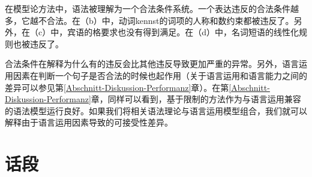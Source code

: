 在模型论方法中，语法被理解为一个合法条件系统。一个表达违反的合法条件越多，它越不合法\citep[--27]{PS2001a}。在（b）中，动词kennst的词项的人称和数约束都被违反了。另外，在（c）中，宾语的格要求也没有得到满足。在（d）中，名词短语的线性化规则也被违反了。

合法条件在解释为什么有的违反会比其他违反导致更加严重的异常。另外，语言运用因素在判断一个句子是否合法的时候也起作用（关于语言运用和语言能力之间的差异可以参见第\ref{Abschnitt-Diskussion-Performanz}章）。在第\ref{Abschnitt-Diskussion-Performanz}章，同样可以看到，基于限制的方法作为与语言运用兼容的语法模型运行良好。如果我们将相关语法理论与语言运用模型组合，我们就可以解释由于语言运用因素导致的可接受性差异。

\section{话段}

